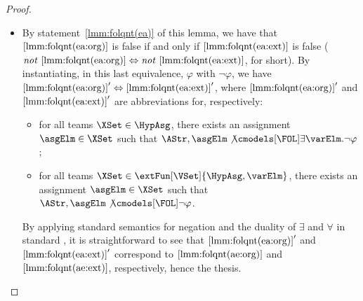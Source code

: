 \documentclass[authoryear]{elsarticle}
\begin{document}
\begin{proof}
\begin{itemize}
  \item[($\ref{lmm:folqnt(ae:org)} \Leftrightarrow \ref{lmm:folqnt(ae:ext)}$)]
    By statement~\ref{lmm:folqnt(ea)} of this lemma, we have that
    $\ref{lmm:folqnt(ea:org)}$ is false if and only if
    $\ref{lmm:folqnt(ea:ext)}$ is false ($\mathit{not} \
    \ref{lmm:folqnt(ea:org)} \Leftrightarrow \mathit{not} \
    \ref{lmm:folqnt(ea:ext)}$, for short).
    By instantiating, in this last equivalence, $\varphi$ with $\neg\varphi$, we
    have $\ref{lmm:folqnt(ea:org)}' \Leftrightarrow \ref{lmm:folqnt(ea:ext)}'$,
    where $\ref{lmm:folqnt(ea:org)}'$ and $\ref{lmm:folqnt(ea:ext)}'$ are
    abbreviations for, respectively:

    \begin{itemize}
    \item for all teams $\XSet \in \HypAsg$, there exists an assignment $\asgElm
      \in \XSet$ such that $\AStr, \asgElm \not\cmodels[\FOL] \exists \varElm
      . \neg \varphi$;
    \item for all teams $\XSet \in \extFun[\VSet]{\HypAsg, \varElm}$, there
      exists an assignment $\asgElm \in \XSet$ such that $\AStr, \asgElm
      \not\cmodels[\FOL] \neg \varphi$.
    \end{itemize}

    By applying standard \FOL semantics for negation and the duality of
    $\exists$ and $\forall$ in standard \FOL, it is straightforward to see that
    $\ref{lmm:folqnt(ea:org)}'$ and $\ref{lmm:folqnt(ea:ext)}'$ correspond to
    $\ref{lmm:folqnt(ae:org)}$ and $\ref{lmm:folqnt(ae:ext)}$, respectively,
    hence the thesis. \qedhere
  \end{itemize}
\end{proof}
\end{document}
